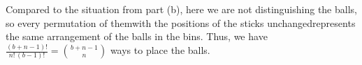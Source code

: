Compared to the situation from part (b), here we are not distinguishing the balls, so every permutation of them\dash with the positions of the sticks unchanged\dash represents the same arrangement of the balls in the bins.
Thus, we have $\frac{(b+n-1)!}{n!\,(b-1)!}=\binom{b+n-1}{n}$ ways to place the balls.
